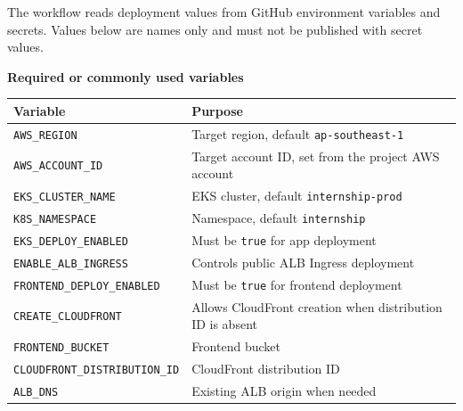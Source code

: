 The workflow reads deployment values from GitHub environment variables
and secrets. Values below are names only and must not be published with
secret values.

\vspace{0.5em}\noindent\textbf{Required or commonly used
variables}\par

{
\begingroup
\small
\setlength{\tabcolsep}{3pt}
\renewcommand{\arraystretch}{1.15}
\begin{longtable}{@{}
  >{\raggedright\arraybackslash}p{}
  >{\raggedright\arraybackslash}p{}@{}}
\toprule\noalign{}
\begin{minipage}[b]{\linewidth}\raggedright
Variable
\end{minipage} & \begin{minipage}[b]{\linewidth}\raggedright
Purpose
\end{minipage} \\
\midrule\noalign{}
\endhead
\bottomrule\noalign{}
\endlastfoot
\texttt{AWS\_\allowbreak{}REGION} & Target region, default \texttt{ap-\allowbreak{}southeast-\allowbreak{}1} \\
\texttt{AWS\_\allowbreak{}ACCOUNT\_\allowbreak{}ID} & Target account ID, set from the project AWS
account \\
\texttt{EKS\_\allowbreak{}CLUSTER\_\allowbreak{}NAME} & EKS cluster, default
\texttt{internship-\allowbreak{}prod} \\
\texttt{K8S\_\allowbreak{}NAMESPACE} & Namespace, default \texttt{internship} \\
\texttt{EKS\_\allowbreak{}DEPLOY\_\allowbreak{}ENABLED} & Must be \texttt{true} for app
deployment \\
\texttt{ENABLE\_\allowbreak{}ALB\_\allowbreak{}INGRESS} & Controls public ALB Ingress
deployment \\
\texttt{FRONTEND\_\allowbreak{}DEPLOY\_\allowbreak{}ENABLED} & Must be \texttt{true} for frontend
deployment \\
\texttt{CREATE\_\allowbreak{}CLOUDFRONT} & Allows CloudFront creation when
distribution ID is absent \\
\texttt{FRONTEND\_\allowbreak{}BUCKET} & Frontend bucket \\
\texttt{CLOUDFRONT\_\allowbreak{}DISTRIBUTION\_\allowbreak{}ID} & CloudFront distribution ID \\
\texttt{ALB\_\allowbreak{}DNS} & Existing ALB origin when needed \\

\end{longtable}}

